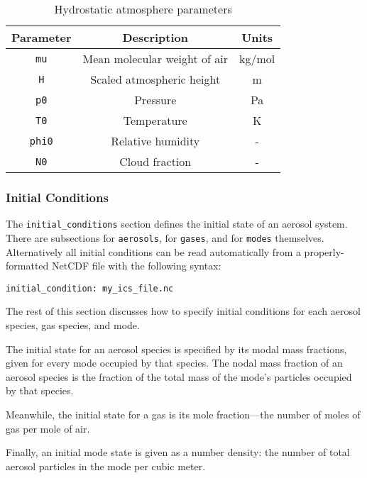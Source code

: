 \begin{table}[htbp]
\caption{Hydrostatic atmosphere parameters}
\centering
\label{tab:hydrostatic_atm}
\begin{tabular}{ccc}
  \toprule
  Parameter   & Description                  & Units   \\
  \midrule
  \texttt{mu}   & Mean molecular weight of air & kg/mol  \\
  \texttt{H}    & Scaled atmospheric height    & m       \\
  \texttt{p0}   & Pressure                     & Pa      \\
  \texttt{T0}   & Temperature                  & K       \\
  \texttt{phi0} & Relative humidity            & -       \\
  \texttt{N0}   & Cloud fraction               & -       \\
  \bottomrule
\end{tabular}
\end{table}

\subsubsection*{Initial Conditions}

The \texttt{initial\_conditions} section defines the initial state of an aerosol
system. There are subsections for \texttt{aerosols}, for \texttt{gases}, and
for \texttt{modes} themselves. Alternatively all initial conditions can be read
automatically from a properly-formatted NetCDF file with the following
syntax:

\begin{verbatim}
initial_condition: my_ics_file.nc
\end{verbatim}

The rest of this section discusses how to specify initial conditions for each
aerosol species, gas species, and mode.

The initial state for an aerosol species is specified by its modal mass
fractions, given for every mode occupied by that species. The nodal mass
fraction of an aerosol species is the fraction of the total mass of the mode's
particles occupied by that species.

Meanwhile, the initial state for a gas is its mole fraction---the number of
moles of gas per mole of air.

Finally, an initial mode state is given as a number density: the number of total
aerosol particles in the mode per cubic meter.

